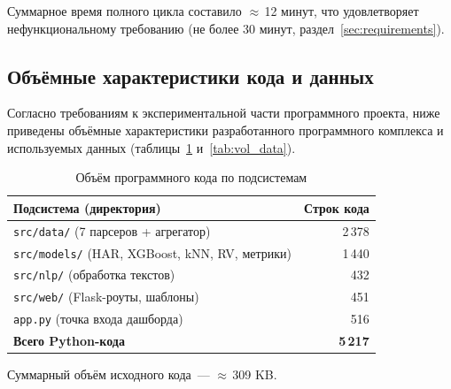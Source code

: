 Суммарное время полного цикла составило $\approx$\,12 минут,
что удовлетворяет нефункциональному требованию
(не более 30 минут, раздел~\ref{sec:requirements}).

\subsection{Объёмные характеристики кода и данных}
\label{sec:volume}

Согласно требованиям к экспериментальной части программного проекта,
ниже приведены объёмные характеристики разработанного программного
комплекса и используемых данных
(таблицы~\ref{tab:vol_code} и~\ref{tab:vol_data}).

\begin{table}[h!]
\centering
\caption{Объём программного кода по подсистемам}
\label{tab:vol_code}
\begin{tabular}{lr}
\hline
Подсистема (директория) & Строк кода \\
\hline
\texttt{src/data/} (7 парсеров + агрегатор)        & 2\,378 \\
\texttt{src/models/} (HAR, XGBoost, kNN, RV, метрики) & 1\,440 \\
\texttt{src/nlp/}    (обработка текстов)            &    432 \\
\texttt{src/web/}    (Flask-роуты, шаблоны)         &    451 \\
\texttt{app.py}      (точка входа дашборда)         &    516 \\
\hline
\textbf{Всего Python-кода}                          & \textbf{5\,217} \\
\hline
\end{tabular}

\medskip
\raggedright
\footnotesize Суммарный объём исходного кода~--- $\approx$\,309 KB.
\end{table}

